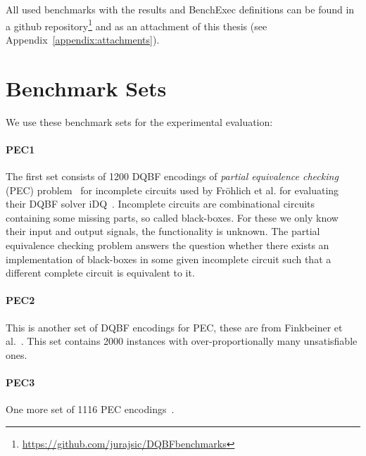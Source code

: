 \documentclass[
  digital, %
  color,
  twoside, %
  table,   %
  nolof,     %
  nolot,     %
]{fithesis3}
\theoremstyle{definition}
\theoremstyle{remark}
\begin{document}
All used benchmarks with the results and BenchExec definitions can be found in a github repository\footnote{\url{https://github.com/jurajsic/DQBFbenchmarks}} and as an attachment of this thesis (see Appendix~\ref{appendix:attachments}).

\section{Benchmark Sets}
We use these benchmark sets for the experimental evaluation:


\paragraph{PEC1}
The first set consists of 1200 DQBF encodings of \emph{partial equivalence checking} (PEC) problem~\cite{PECScholl} for incomplete circuits used by Fr\"{o}hlich et al. for evaluating their DQBF solver iDQ~\cite{iDQandDQDIMACS}. Incomplete circuits are combinational circuits containing some missing parts, so called black-boxes. For these we only know their input and output signals, the functionality is unknown. The partial equivalence checking problem answers the question whether there exists an implementation of black-boxes in some given incomplete circuit such that a different complete circuit is equivalent to it.

\paragraph{PEC2}
This is another set of DQBF encodings for PEC, these are from Finkbeiner et al.~\cite{FastDQBFRefutation}. This set contains 2000 instances with over-proportionally many unsatisfiable ones.

\paragraph{PEC3}
One more set of 1116 PEC encodings~\cite{HQSsimpleAlg,PECScholl}.
\end{document}
